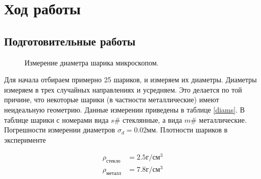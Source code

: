 \documentclass[a4paper, 12pt]{article}
\begin{document}
    \section{Ход работы}
    \subsection{Подготовительные работы}
    \begin{figure}[h]
        \caption{Измерение  диаметра шарика микроскопом.}
        \label{ris:sharik}
    \end{figure}
    Для начала отбираем примерно 25 шариков, и измеряем их диаметры. Диаметры измеряем в трех случайных направлениях и усредняем. Это делается по той причине, что некоторые шарики (в частности металлические) имеют неидеальную геометрию. Данные измерении приведены в таблице \ref{diams}. В таблице шарики с номерами вида $s\#$ стеклянные, а вида $m\#$ металлические. Погрешности измерении диаметров $\sigma_d = 0.02мм$. Плотности шариков в эксперименте

    \begin{align*}
        \rho_{стекло}&=2.5г/см^3\\
        \rho_{металл}&=7.8г/см^3
    \end{align*}

    \newpage
\end{document}
